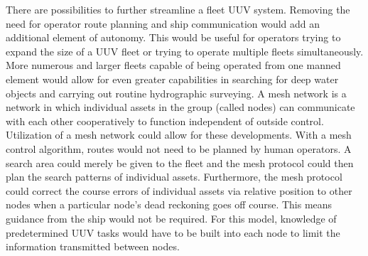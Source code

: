 \documentclass[10pt]{article}
\begin{document}
There are possibilities to further streamline a fleet UUV system. Removing the need for operator route planning and ship communication would add an additional element of autonomy. This would be useful for operators trying to expand the size of a UUV fleet or trying to operate multiple fleets simultaneously. More numerous and larger fleets capable of being operated from one manned element would allow for even greater capabilities in searching for deep water objects and carrying out routine hydrographic surveying. A mesh network is a network in which individual assets in the group (called nodes) can communicate with each other cooperatively to function independent of outside control. Utilization of a mesh network could allow for these developments. With a mesh control algorithm, routes would not need to be planned by human operators. A search area could merely be given to the fleet and the mesh protocol could then plan the search patterns of individual assets. Furthermore, the mesh protocol could correct the course errors of individual assets via relative position to other nodes when a particular node’s dead reckoning goes off course. This means guidance from the ship would not be required. For this model, knowledge of predetermined UUV tasks would have to be built into each node to limit the information transmitted between nodes. 
\end{document}
